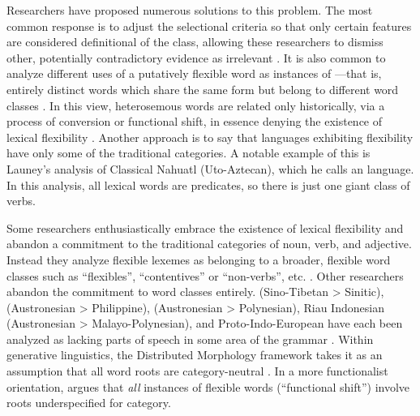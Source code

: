 Researchers have proposed numerous solutions to this problem. The most common response is to adjust the selectional criteria so that only certain features are considered definitional of the class, allowing these researchers to dismiss other, potentially contradictory evidence as irrelevant . It is also common to analyze different uses of a putatively flexible word as instances of —that is, entirely distinct words which share the same form but belong to different word classes \parencite{Lichtenberk1991}. In this view, heterosemous words are related only historically, via a process of conversion or functional shift, in essence denying the existence of lexical flexibility \parencite{EvansOsada2005}. Another approach is to say that languages exhibiting flexibility have only some of the traditional categories. A notable example of this is Launey's \parencites{Launey1994}{Launey2004} analysis of Classical Nahuatl (Uto-Aztecan), which he calls an  language. In this analysis, all lexical words are predicates, so there is just one giant class of verbs.

Some researchers enthusiastically embrace the existence of lexical flexibility and abandon a commitment to the traditional categories of noun, verb, and adjective. Instead they analyze flexible lexemes as belonging to a broader, flexible word classes such as \enquote{flexibles}, \enquote{contentives} or \enquote{non-verbs}, etc. \parencites{HengeveldRijkhoff2005}{Luuk2010}. Other researchers abandon the commitment to word classes entirely.  (Sino-Tibetan > Sinitic),  (Austronesian > Philippine),  (Austronesian > Polynesian), Riau Indonesian (Austronesian > Malayo-Polynesian), and Proto-Indo-European have each been analyzed as lacking parts of speech in some area of the grammar . Within generative linguistics, the Distributed Morphology framework takes it as an assumption that all word roots are category-neutral \parencite{Siddiqi2018}. In a more functionalist orientation, \textcite{Farrell2001} argues that \emph{all} instances of flexible words (\enquote{functional shift}) involve roots underspecified for category.

